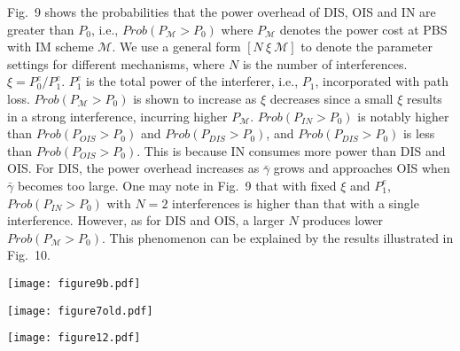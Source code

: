 \documentclass[10pt, conference, letterpaper]{IEEEtran}
\begin{document}
Fig.~9 shows the probabilities that the power overhead of DIS,
OIS and IN are greater than $P_{0}$, i.e., $Prob(P_{\mathcal{M}}>P_{0})$
where $P_{\mathcal{M}}$ denotes the power cost at PBS with IM scheme $\mathcal{M}$.
We use a general form $[N~\xi~\mathcal{M}]$ to denote the parameter settings for different
mechanisms, where $N$ is the number of interferences.
$\xi=P^{e}_{0}/P^{e}_{1}$.
$P^{e}_{1}$ is the total power of the interferer, i.e., $P_{1}$, incorporated with path loss.
$Prob(P_{\mathcal{M}}>P_{0})$ is shown to increase as $\xi$ decreases
since a small $\xi$ results in a strong interference, incurring higher $P_{\mathcal{M}}$.
$Prob(P_{IN}>P_{0})$ is notably higher than
$Prob(P_{OIS}>P_{0})$ and $Prob(P_{DIS}>P_{0})$,
and $Prob(P_{DIS}>P_{0})$ is less than $Prob(P_{OIS}>P_{0})$.
This is because IN consumes more power than DIS and OIS.
For DIS, the power overhead increases as $\bar{\gamma}$ grows and
approaches OIS when $\bar{\gamma}$ becomes too large.
One may note in Fig.~9 that with fixed $\xi$ and $P^{e}_{1}$,
$Prob(P_{IN}>P_{0})$ with $N=2$ interferences is higher than
that with a single interference. However, as for DIS and OIS,
a larger $N$ produces lower $Prob(P_{\mathcal{M}}>P_{0})$.
This phenomenon can be explained by the results illustrated in Fig.~10.
\begin{figure*}[!htb]
\centering
\begin{minipage}{0.66\columnwidth}
\texttt{[image: figure9b.pdf]}
\vspace{-16pt}
\caption{\fontsize{7.2pt}{\baselineskip}}
\label{fig: figure ten}
\end{minipage}
\hfill
\begin{minipage}{0.66\columnwidth}
\centering
\texttt{[image: figure7old.pdf]}
\vspace{-16pt}
\caption{\fontsize{7.2pt}{\baselineskip}}
\label{fig: figure eleven}
\end{minipage}
\hfill
\begin{minipage}{0.66\columnwidth}
\centering
\texttt{[image: figure12.pdf]}
\vspace{-16pt}
\caption{\fontsize{7.2pt}{\baselineskip}}
\label{fig: figure twelve}
\end{minipage}
\vspace*{-0.1in}
\end{figure*}
\end{document}
